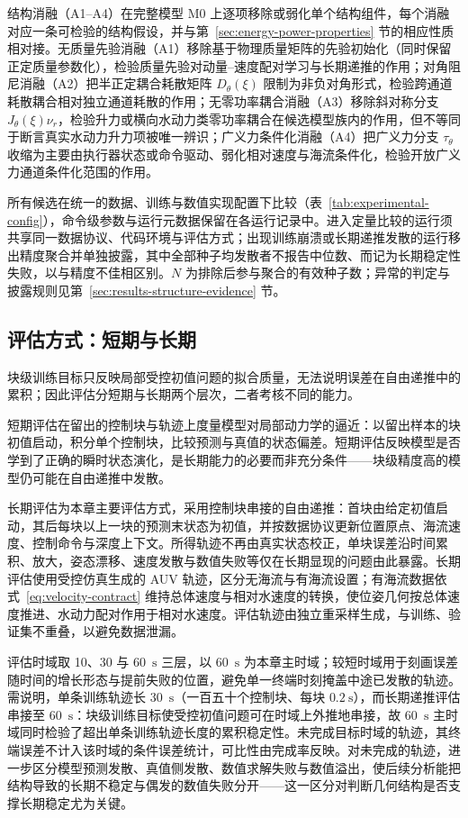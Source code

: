 结构消融（A1--A4）在完整模型 M0 上逐项移除或弱化单个结构组件，每个消融对应一条可检验的结构假设，并与第~\ref{sec:energy-power-properties} 节的相应性质相对接。无质量先验消融（A1）移除基于物理质量矩阵的先验初始化（同时保留正定质量参数化），检验质量先验对动量--速度配对学习与长期递推的作用；对角阻尼消融（A2）把半正定耦合耗散矩阵 \(D_\theta(\xi)\) 限制为非负对角形式，检验跨通道耗散耦合相对独立通道耗散的作用；无零功率耦合消融（A3）移除斜对称分支 \(J_\theta(\xi)\nu_r\)，检验升力或横向水动力类零功率耦合在候选模型族内的作用，但不等同于断言真实水动力升力项被唯一辨识；广义力条件化消融（A4）把广义力分支 \(\tau_\theta\) 收缩为主要由执行器状态或命令驱动、弱化相对速度与海流条件化，检验开放广义力通道条件化范围的作用。

所有候选在统一的数据、训练与数值实现配置下比较（表~\ref{tab:experimental-config}），命令级参数与运行元数据保留在各运行记录中。进入定量比较的运行须共享同一数据协议、代码环境与评估方式；出现训练崩溃或长期递推发散的运行移出精度聚合并单独披露，其中全部种子均发散者不报告中位数、而记为长期稳定性失败，以与精度不佳相区别。\(N\) 为排除后参与聚合的有效种子数；异常的判定与披露规则见第~\ref{sec:results-structure-evidence} 节。

\subsection{评估方式：短期与长期}
\label{subsec:rollout-eval}

块级训练目标只反映局部受控初值问题的拟合质量，无法说明误差在自由递推中的累积；因此评估分短期与长期两个层次，二者考核不同的能力。

短期评估在留出的控制块与轨迹上度量模型对局部动力学的逼近：以留出样本的块初值启动，积分单个控制块，比较预测与真值的状态偏差。短期评估反映模型是否学到了正确的瞬时状态演化，是长期能力的必要而非充分条件——块级精度高的模型仍可能在自由递推中发散。

长期评估为本章主要评估方式，采用控制块串接的自由递推：首块由给定初值启动，其后每块以上一块的预测末状态为初值，并按数据协议更新位置原点、海流速度、控制命令与深度上下文。所得轨迹不再由真实状态校正，单块误差沿时间累积、放大，姿态漂移、速度发散与数值失败等仅在长期显现的问题由此暴露。长期评估使用受控仿真生成的 AUV 轨迹，区分无海流与有海流设置；有海流数据依式~\eqref{eq:velocity-contract} 维持总体速度与相对水速度的转换，使位姿几何按总体速度推进、水动力配对作用于相对水速度。评估轨迹由独立重采样生成，与训练、验证集不重叠，以避免数据泄漏。

评估时域取 10、30 与 60~\(\mathrm{s}\) 三层，以 60~\(\mathrm{s}\) 为本章主时域；较短时域用于刻画误差随时间的增长形态与提前失败的位置，避免单一终端时刻掩盖中途已发散的轨迹。需说明，单条训练轨迹长 30~\(\mathrm{s}\)（一百五十个控制块、每块 \(0.2~\mathrm{s}\)），而长期递推评估串接至 60~\(\mathrm{s}\)：块级训练目标使受控初值问题可在时域上外推地串接，故 60~\(\mathrm{s}\) 主时域同时检验了超出单条训练轨迹长度的累积稳定性。未完成目标时域的轨迹，其终端误差不计入该时域的条件误差统计，可比性由完成率反映。对未完成的轨迹，进一步区分模型预测发散、真值侧发散、数值求解失败与数值溢出，使后续分析能把结构导致的长期不稳定与偶发的数值失败分开——这一区分对判断几何结构是否支撑长期稳定尤为关键。


